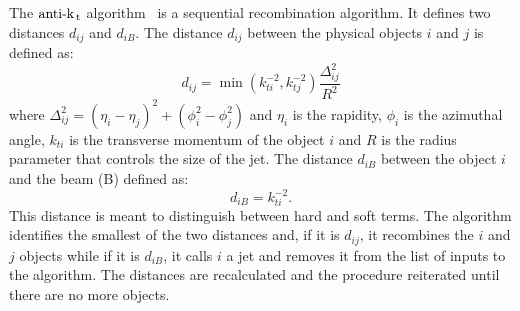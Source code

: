 The $\text{anti-k}_\mathrm{\, t}$ algorithm~\cite{Antikt} is a sequential recombination
algorithm. It defines two distances $d_{ij}$ and $d_{iB}$. The distance $d_{ij}$
between the physical objects $i$ and $j$ is defined as:
\begin{equation}
  \label{eq:89}
  d_{ij} = \min(k_{ti}^{-2}, k_{tj}^{-2}) \frac{\Delta_{ij}^2}{R^2}
\end{equation}
where $\Delta_{ij}^2 = (\eta_i - \eta_j)^2 + (\phi_i^2 - \phi_j^2)$ and $\eta_i$
is the rapidity, $\phi_i$ is the azimuthal angle, $k_{ti}$ is the transverse
momentum of the object $i$ and $R$ is the radius parameter that controls the
size of the jet. The distance $d_{iB}$ between the object $i$ and the beam (B)
defined as:
\begin{equation}
  \label{eq:90}
  d_{iB} = k_{ti}^{-2}.
\end{equation}
This distance is meant to distinguish between hard and soft terms. The algorithm
identifies the smallest of the two distances and, if it is $d_{ij}$, it
recombines the $i$ and $j$ objects while if it is $d_{iB}$, it calls $i$ a jet
and removes it from the list of inputs to the algorithm. The distances are
recalculated and the procedure reiterated until there are no more
objects.
